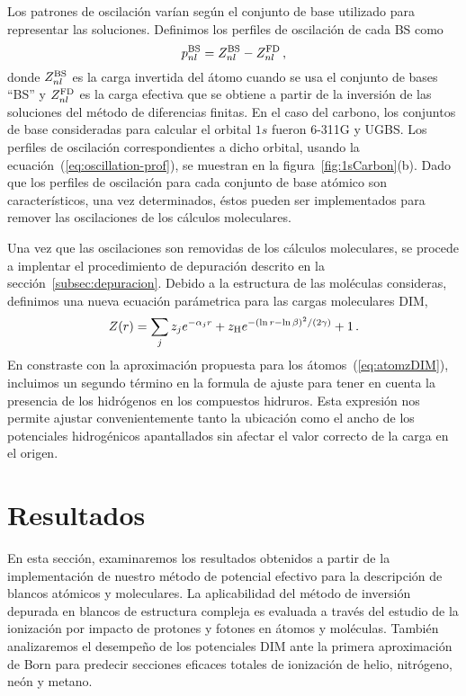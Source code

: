 Los patrones de oscilación varían según el conjunto de base utilizado
para representar las soluciones. Definimos los perfiles de oscilación
de cada BS como
\begin{equation}
 p_{nl}^{\mbox{\scriptsize BS}} = Z_{nl}^{\mbox{\scriptsize BS}}-
 Z_{nl}^{\mbox{\scriptsize FD}} \,,
 \label{eq:oscillation-prof}
\end{equation}
donde $Z_{nl}^{\mbox{\scriptsize BS}}$ es la carga invertida del átomo
cuando se usa el conjunto de bases ``BS'' y $Z_{nl}^{\mbox{\scriptsize FD}}$ 
es la carga efectiva que se obtiene a partir de la inversión de las 
soluciones del método de diferencias finitas. En el caso del carbono,
los conjuntos de base consideradas para calcular el orbital $1s$ fueron
\mbox{6-311G} y UGBS. Los perfiles de oscilación correspondientes a
dicho orbital, usando la ecuación~(\ref{eq:oscillation-prof}), 
se muestran en la figura~\ref{fig:1sCarbon}(b). Dado que los perfiles 
de oscilación para cada conjunto de base atómico son característicos,
una vez determinados, éstos pueden ser implementados para remover las
oscilaciones de los cálculos moleculares. 

Una vez que las oscilaciones son removidas de los cálculos moleculares, 
se procede a implentar el procedimiento de depuración descrito en la
sección~\ref{subsec:depuracion}. Debido a la 
estructura de las moléculas consideras, definimos una nueva ecuación 
parámetrica para las cargas moleculares DIM,
\begin{eqnarray}
 Z(r) = \sum_j z_j e^{-\alpha_j r} 
 + z_{\mbox{\scriptsize H}} e^{-(\ln r - \ln \beta)^2/(2\gamma)} 
 + 1\,.
 \label{eq:molzDIM}
\end{eqnarray}
En constraste con la aproximación propuesta para los 
átomos~(\ref{eq:atomzDIM}), incluimos un segundo término en la 
formula de ajuste para tener en cuenta la presencia de los hidrógenos en 
los compuestos hidruros. Esta expresión nos permite ajustar 
convenientemente tanto la ubicación como el ancho de los potenciales
hidrogénicos apantallados sin afectar el valor correcto de la carga en 
el origen.


\section{Resultados}
\label{sec:dimresultados}

En esta sección, examinaremos los resultados obtenidos a partir de la 
implementación de nuestro método de potencial efectivo para la descripción 
de blancos atómicos y moleculares. 
La aplicabilidad del método de inversión depurada en blancos de 
estructura compleja es evaluada a través del estudio de la ionización 
por impacto de protones y fotones en átomos y moléculas. También 
analizaremos el desempeño de los potenciales DIM ante la primera 
aproximación de Born para predecir secciones eficaces totales de 
ionización de helio, nitrógeno, neón y metano.

